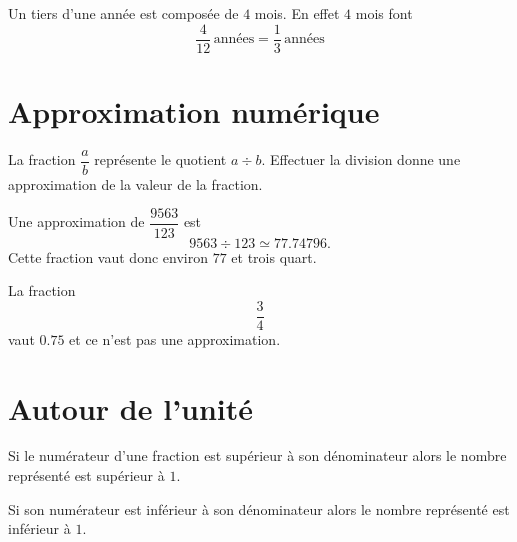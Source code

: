 \begin{example}
    Un tiers d'une année est composée de \( 4\) mois. En effet \( 4\) mois font
    \begin{equation}
        \frac{ 4 }{ 12 }\,\text{années}=\frac{ 1 }{ 3 }\,\text{années}
    \end{equation}
\end{example}

\section{Approximation numérique}

\begin{Aretenir}
    La fraction \( \dfrac{ a }{ b }\) représente le quotient \( a\div b\). Effectuer la division donne une approximation de la valeur de la fraction.
\end{Aretenir}

\begin{example}
    Une approximation de \( \dfrac{ 9563 }{ 123 }\) est
    \begin{equation}
     9563\div 123\simeq 77.74796.
    \end{equation}
    Cette fraction vaut donc environ \( 77\) et trois quart.
\end{example}

\begin{example}
    La fraction
    \begin{equation}
        \frac{ 3 }{ 4 }
    \end{equation}
    vaut \( 0.75\) et ce n'est pas une approximation.
\end{example}


\section{Autour de l'unité}
\label{SecBOWKooVquFyG}

\begin{Aretenir}
Si le numérateur d'une fraction est supérieur à son dénominateur alors le nombre représenté est supérieur à $1$.

Si son numérateur est inférieur à son dénominateur alors le nombre représenté est inférieur à $1$.
\end{Aretenir}

